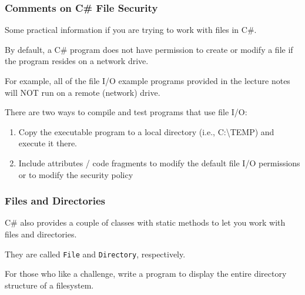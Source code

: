 \begin{frame}
\frametitle{Comments on C\# File Security}
Some practical information if you are trying to work with files in C\#.

By default, a C\# program does not have permission to create or modify a file if the program resides on a network drive.

For example, all of the file I/O example programs provided in the lecture notes will NOT run on a remote (network) drive.

There are two ways to compile and test programs that use file I/O:
\begin{enumerate}
\item Copy the executable program to a local directory (i.e., C:\textbackslash TEMP) and execute it there.

\item Include attributes / code fragments to modify the default file I/O permissions or to modify the security policy
\end{enumerate}

\end{frame}

\begin{frame}
\frametitle{Files and Directories}
C\# also provides a couple of classes with static methods to let you work with files and directories.

They are called \texttt{File} and \texttt{Directory}, respectively.

For those who like a challenge, write a program to display the entire directory structure of a filesystem.


\end{frame}



